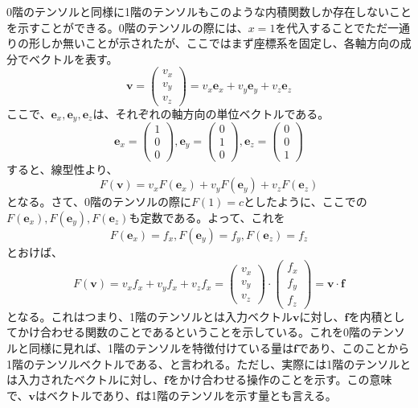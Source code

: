0階のテンソルと同様に1階のテンソルもこのような内積関数しか存在しないことを示すことができる。0階のテンソルの際には、\(x=1\)を代入することでただ一通りの形しか無いことが示されたが、ここではまず座標系を固定し、各軸方向の成分でベクトルを表す。
\begin{equation}
	\boldsymbol{v}=  \begin{pmatrix} v_x \\v_y \\v_z \end{pmatrix} = v_x\boldsymbol{e}_x+v_y\boldsymbol{e}_y+v_z\boldsymbol{e}_z
\end{equation}
ここで、\(\boldsymbol{e}_x,\boldsymbol{e}_y,\boldsymbol{e}_z\)は、それぞれの軸方向の単位ベクトルである。
\begin{equation}
	\boldsymbol{e}_x=  \begin{pmatrix} 1 \\0 \\0 \end{pmatrix} ,
	\boldsymbol{e}_y=  \begin{pmatrix} 0 \\1 \\0 \end{pmatrix} ,
	\boldsymbol{e}_z=  \begin{pmatrix} 0 \\0 \\1 \end{pmatrix}
\end{equation}
すると、線型性より、
\begin{equation}
	F(\boldsymbol{v})=v_xF(\boldsymbol{e}_x)+v_yF(\boldsymbol{e}_y)+v_zF(\boldsymbol{e}_z)
\end{equation}
となる。さて、0階のテンソルの際に\(F(1)=c\)としたように、ここでの\(F(\boldsymbol{e}_x),F(\boldsymbol{e}_y),F(\boldsymbol{e}_z)\)も定数である。よって、これを
\begin{equation}
	F(\boldsymbol{e}_x)=f_x, F(\boldsymbol{e}_y)=f_y, F(\boldsymbol{e}_z)=f_z
\end{equation}
とおけば、
\begin{equation}
	F(\boldsymbol{v})=v_xf_x+v_yf_x+v_zf_x=\begin{pmatrix} v_x \\v_y \\v_z \end{pmatrix}\cdot \begin{pmatrix} f_x \\f_y \\f_z \end{pmatrix}=\boldsymbol{v}\cdot \boldsymbol{f}
\end{equation}
となる。これはつまり、1階のテンソルとは入力ベクトル\(\boldsymbol{v}\)に対し、\(\boldsymbol{f}\)を内積としてかけ合わせる関数のことであるということを示している。これを0階のテンソルと同様に見れば、1階のテンソルを特徴付けている量は\(\boldsymbol{f}\)であり、このことから1階のテンソルベクトルである、と言われる。ただし、実際には1階のテンソルとは入力されたベクトルに対し、\(\boldsymbol{f}\)をかけ合わせる操作のことを示す。この意味で、\(\boldsymbol{v}\)はベクトルであり、\(\boldsymbol{f}\)は1階のテンソルを示す量とも言える。
